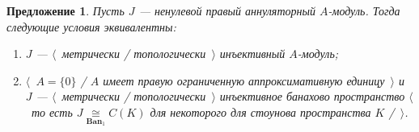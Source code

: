 \documentclass[12pt]{article}
\newcommand{\isom}[1]{\mathop{\mathbin{\cong}}\limits_{#1}}
\newtheorem{proposition}[theorem]{Предложение}
\begin{document}
\begin{proposition}\label{MetTopInjOfAnnihModCharac} Пусть $J$ --- ненулевой
    правый аннуляторный $A$-модуль. Тогда следующие условия эквивалентны:
    \begin{enumerate}[label = (\roman*)]
        \item $J$ --- $\langle$~метрически / топологически~$\rangle$ инъективный
              $A$-модуль;

        \item $\langle$~$A= \{0 \}$ / $A$ имеет правую ограниченную
              аппроксимативную единицу~$\rangle$ и $J$ ---  $\langle$~метрически /
              топологически~$\rangle$ инъективное банахово пространство $\langle$~то есть
              $J\isom{\mathbf{Ban}_1}C(K)$ для некоторого для стоунова пространства $K$
              /~$\rangle$.
    \end{enumerate}

\end{proposition}
\end{document}
